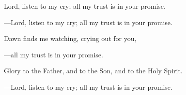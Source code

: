 \responsory
\begin{hangpar}

Lord, listen to my cry; all my trust is in your promise.

{\color{red}---\thinspace}Lord, listen to my cry; all my trust is in your promise.

\medskip Dawn finds me watching, crying out for you,

{\color{red}---\thinspace}all my trust is in your promise.

\medskip Glory to the Father, and to the Son, and to the Holy Spirit.

{\color{red}---\thinspace}Lord, listen to my cry; all my trust is in your promise.
\end{hangpar}
